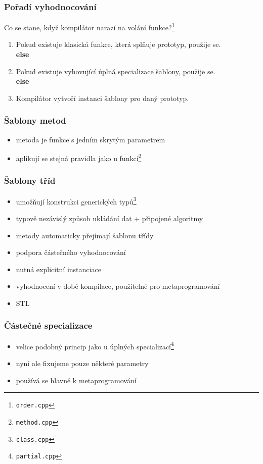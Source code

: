 \begin{frame} \frametitle{Pořadí vyhodnocování}
	Co se stane, když kompilátor narazí na volání funkce?\footnote{\texttt{order.cpp}}
	\begin{enumerate}
		\item{Pokud existuje klasická funkce, která splňuje prototyp, použije se.}\\
	\textbf{else}
		\item{Pokud existuje vyhovující úplná specializace šablony, použije se.}\\
	\textbf{else}
		\item{Kompilátor vytvoří instanci šablony pro daný prototyp.}
	\end{enumerate}
\end{frame}

\begin{frame} \frametitle{Šablony metod}
	\begin{itemize}
		\item{metoda je funkce s jedním skrytým parametrem}
		\item{aplikují se stejná pravidla jako u funkcí\footnote{\texttt{method.cpp}}}
	\end{itemize}
\end{frame}

\begin{frame} \frametitle{Šablony tříd}
	\begin{itemize}
		\item{umožňují konstrukci generických typů\footnote{\texttt{class.cpp}}}
		\item{typově nezávislý způsob ukládání dat + připojené algoritmy}
		\item{metody automaticky přejímají šablonu třídy}
		\item{podpora částečného vyhodnocování}
		\item{nutná explicitní instanciace}
		\item{vyhodnocení v době kompilace, použitelné pro metaprogramování}
		\item{STL}
	\end{itemize}
\end{frame}

\begin{frame} \frametitle{Částečné specializace}
	\begin{itemize}
		\item{velice podobný princip jako u úplných specializací\footnote{\texttt{partial.cpp}}}
		\item{nyní ale fixujeme pouze některé parametry}
		\item{používá se hlavně k metaprogramování}
	\end{itemize}
\end{frame}

